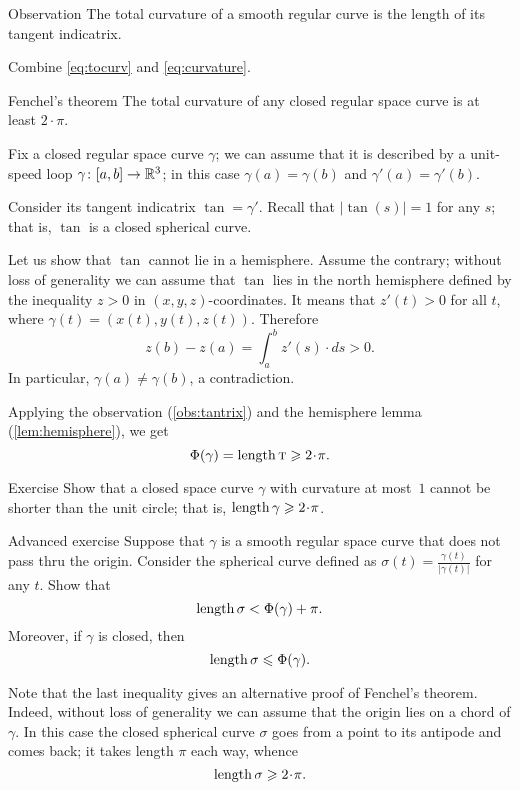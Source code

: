 \begin{thm}{Observation}\label{obs:tantrix}
The total curvature of a smooth regular curve is the length of its tangent indicatrix.
\end{thm}

Combine \ref{eq:tocurv} and \ref{eq:curvature}.
\qedsf %


\begin{thm}{Fenchel's theorem}\label{thm:fenchel}
The total curvature of any closed regular space curve is at least $2\cdot\pi$.
\end{thm}

Fix a closed regular space curve $\gamma$;
we can assume that it is described by a unit-speed loop $\gamma\colon[a,b]\to \mathbb{R}^3$;
in this case $\gamma(a)=\gamma(b)$ and $\gamma'(a)=\gamma'(b)$.

Consider its tangent indicatrix $\tan=\gamma'$.
Recall that $|\tan(s)|=1$ for any $s$; that is, $\tan$ is a closed spherical curve.

Let us show that $\tan$ cannot lie in a hemisphere.
Assume the contrary; without loss of generality we can assume that $\tan$ lies in the north hemisphere defined by the inequality $z>0$ in $(x,y,z)$-coordinates.
It means that $z'(t)>0$ for all $t$, where $\gamma(t)=(x(t), y(t), z(t))$.
Therefore 
\[z(b)-z(a)=\int_a^bz'(s)\cdot ds>0.\]
In particular, $\gamma(a)\ne \gamma(b)$, a contradiction.

Applying the observation (\ref{obs:tantrix}) and the hemisphere lemma (\ref{lem:hemisphere}), we get  
\[\tc\gamma=\length \tan\ge2\cdot\pi.\]
\qedsf

\begin{thm}{Exercise}\label{ex:length>=2pi}
Show that a closed space curve $\gamma$ with curvature at most~$1$ cannot be shorter than the unit circle;
that is, $\length\gamma\ge 2\cdot \pi$.
\end{thm}


\begin{thm}{Advanced exercise}\label{ex:gamma/|gamma|}
Suppose that $\gamma$ is a smooth regular space curve that does not pass thru the origin.
Consider the spherical curve defined as $\sigma(t)=\frac{\gamma(t)}{|\gamma(t)|}$ for any $t$.
Show that 
\[\mathop{\rm length}\nolimits \sigma< \Phi({\gamma})+\pi.\]
Moreover, if $\gamma$ is closed, then
\[\mathop{\rm length}\nolimits \sigma\leqslant \Phi({\gamma}).\]
\end{thm}

Note that the last inequality gives an alternative proof of Fenchel's theorem.
Indeed, without loss of generality we can assume that the origin lies on a chord of $\gamma$.
In this case the closed spherical curve $\sigma$ goes from a point to its antipode and comes back; 
it takes length $\pi$ each way, 
whence 
\[\length\sigma\ge 2\cdot\pi.\]




